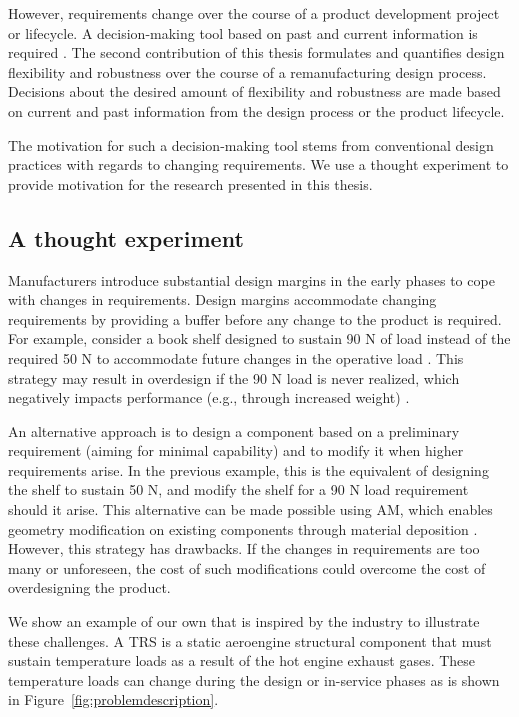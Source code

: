 However, requirements change over the course of a product development project or life\-cycle. A decision-making tool based on past and current information is required \cite{Eckert2019}. The second contribution of this thesis formulates and quantifies design flexibility and robustness over the course of a remanufacturing design process. Decisions about the desired amount of flexibility and robustness are made based on current and past information from the design process or the product lifecycle.

The motivation for such a decision-making tool stems from conventional design practices with regards to changing requirements. We use a thought experiment to provide motivation for the research presented in this thesis.

\subsection{A thought experiment} \label{subsec:thoughtexperiment}

Manufacturers introduce substantial design margins in the early phases to cope with changes in requirements. Design margins accommodate changing requirements by providing a buffer before any change to the product is required. For example, consider a book shelf designed to sustain 90 N of load instead of the required 50 N to accommodate future changes in the operative load \cite{Eckert2019}. This strategy may result in overdesign if the 90 N load is never realized, which negatively impacts performance (e.g., through increased weight) \cite{Long2017,ullman2009mechanical}. 

An alternative approach is to design a component based on a preliminary requirement (aiming for minimal capability) and to modify it when higher requirements arise. In the previous example, this is the equivalent of designing the shelf to sustain 50 N, and modify the shelf for a 90 N load requirement should it arise. This alternative can be made possible using \ac{AM}, which enables geometry modification on existing components through material deposition \cite{Ijomah2009,Ijomah2010,Golinska2015}. However, this strategy has drawbacks. If the changes in requirements are too many or unforeseen, the cost of such modifications could overcome the cost of overdesigning the product.

We show an example of our own that is inspired by the industry to illustrate these challenges. A \ac{TRS} is a static aeroengine structural component that must sustain temperature loads as a result of the hot engine exhaust gases. These temperature loads can change during the design or in-service phases as is shown in Figure~\ref{fig:problemdescription}.

